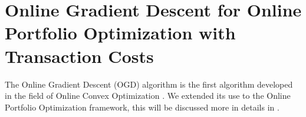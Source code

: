\chapter{Online Gradient Descent for Online Portfolio Optimization with Transaction Costs}

The Online Gradient Descent (OGD) algorithm is the first algorithm developed in the field of Online Convex Optimization \cite{zinkevich2003online}. We extended its use to the Online Portfolio Optimization framework, this will be discussed more in details in .  